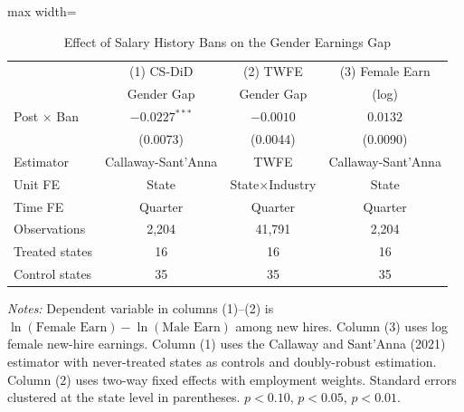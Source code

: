 \begin{table}[htbp]
\centering
\caption{Effect of Salary History Bans on the Gender Earnings Gap}
\label{tab:main}
\begin{threeparttable}
\begin{adjustbox}{max width=\textwidth}
\begin{tabular}{lccc}
\toprule
 & (1) CS-DiD & (2) TWFE & (3) Female Earn \\
 & Gender Gap & Gender Gap & (log) \\
\midrule
Post $\times$ Ban & $-0.0227^{***}$ & $-0.0010$ & $0.0132$ \\
 & (0.0073) & (0.0044) & (0.0090) \\
\midrule
Estimator & Callaway-Sant'Anna & TWFE & Callaway-Sant'Anna \\
Unit FE & State & State$\times$Industry & State \\
Time FE & Quarter & Quarter & Quarter \\
Observations & 2,204 & 41,791 & 2,204 \\
Treated states & 16 & 16 & 16 \\
Control states & 35 & 35 & 35 \\
\bottomrule
\end{tabular}
\end{adjustbox}
\begin{tablenotes}[flushleft]
\small
\item \textit{Notes:} Dependent variable in columns (1)--(2) is $\ln(\text{Female Earn}) - \ln(\text{Male Earn})$
among new hires. Column (3) uses log female new-hire earnings.
Column (1) uses the Callaway and Sant'Anna (2021) estimator with never-treated states as controls
and doubly-robust estimation. Column (2) uses two-way fixed effects with employment weights.
Standard errors clustered at the state level in parentheses.
\sym{*} $p<0.10$, \sym{**} $p<0.05$, \sym{***} $p<0.01$.
\end{tablenotes}
\end{threeparttable}
\end{table}

